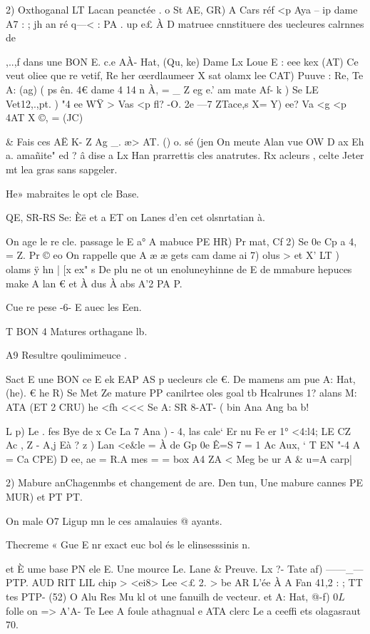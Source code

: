 \documentclass[12pt,a4paper]{article}
\begin{document}
2) Oxthoganal LT Lacan peanctée . 
o St AE, GR) A Cars réf <p Aya -- ip dame A7 : ; jh an ré q—< : PA . up 
e£ À D matruee cnnstituere des uecleures calrnnes de {,..,f dans une BON E. c.e AÀ- Hat, (Qu, ke) 
Dame Lx Loue E : eee kex (AT) 
Ce veut oliee que re vetif, Re her œerdlaumeer X sat olamx lee CAT) 
Puuve : Re, Te A: (ag) ( ps 
ên. 4€ dame 4 14 n À, = _ Z eg e.' am mate Af- k ) Se LE Vet12,.,pt. ) 
"4 ee WŸ > Vas <p fl? -O. 2e —7 ZTace,s X= Y) ee? Va <g <p 4AT X ©, 
= (JC) 

& 
Fais ces AË K- Z Ag %
_. æ> AT. () o. sé (jen 
On meute Alan vue OW D ax Eh a. amañite" ed ? â dise a Lx Han prarrettis cles anatrutes. 
Rx acleurs , celte Jeter mt lea gras sans sapgeler.

He» mabraites le opt cle Base.


QE, SR-RS Se: Èë et a ET on Lanes d'en cet olsnrtatian à.


On age le re cle. passage le E a° A mabuce PE HR) Pr mat, Cf 2) 
Se 0e Cp a 4, = Z. Pr © eo On rappelle que A æ æ gets cam dame ai 7) olus > et X’ LT ) olams ÿ hn | 
[x ex" 
s De plu ne ot un enoluneyhinne de E de mmabure  hepuces make A lan € et À dus À abs 
A'2 PA P.

Cue re pese -6- E auec les Een.



T BON 4 Matures orthagane lb.


A9 Resultre qoulimimeuce .


Sact E une BON ce E ek EAP AS p uecleurs cle €. De mamens am pue A: Hat, (he). € he R) 
Se Met Ze mature PP canilrtee oles goal tb Hcalrunes 1? alans 
M: ATA (ET 2 CRU) he <fh <<< 
Se A: SR 8-AT- ( bin Ana Ang ba b!


L 
p) Le . fes Bye de x Ce La 7 Ana ) - 4, las cale‘ Er nu Fe er 1° <4:l4; LE CZ Ac , Z - A,j Eà ? z ) Lan <e&le = À de Gp 0e Ê=S 7 = 1 Ac Aux, 
‘ T EN "-4 A = Ca CPE) D ee, ae 
= R.A mes = = box A4 
ZA < 
Meg be ur A & 
u=A 
carp| 

2) Mabure anChagenmbs et changement de are. 
Den tun, Une mabure cannes PE MUR) et PT PT.


On male O7 Ligup mn le ces amalauies @ ayants.


Thecreme « Gue E nr exact euc bol és le elinsesssinis n.

et È ume base PN ele E. Une mource Le. Lane & 
Preuve. Lx ?- Tate af) 
——_— 
PTP. AUD RIT LIL chip > <ei8> Lee <£ 2. > 
be AR 
L'ée À A Fan 41,2 : ; TT tes PTP- (52) 
O Alu Res Mu kl ot une fanuilh de vecteur. et A: Hat, @-f) $ 0 L $ folle on => A'A- Te 
Lee A foule athagnual e ATA clerc Le a ceeffi ets olagasraut 70. 


}
\end{document}
